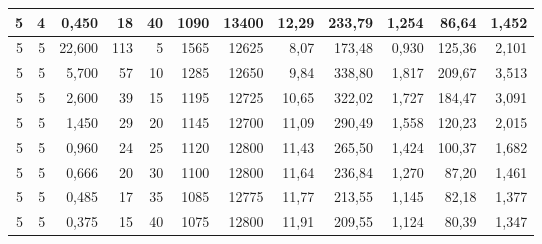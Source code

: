 \begin{tabular}{rrrrrrrrrrrr}
5 & 4 & 0,450 & 18 & 40 & 1090 & 13400 & 12,29 & 233,79 & 1,254 & 86,64 & 1,452 \\ \hline
5 & 5 & 22,600 & 113 & 5 & 1565 & 12625 & 8,07 & 173,48 & 0,930 & 125,36 & 2,101 \\ \hline
5 & 5 & 5,700 & 57 & 10 & 1285 & 12650 & 9,84 & 338,80 & 1,817 & 209,67 & 3,513 \\ \hline
5 & 5 & 2,600 & 39 & 15 & 1195 & 12725 & 10,65 & 322,02 & 1,727 & 184,47 & 3,091 \\ \hline
5 & 5 & 1,450 & 29 & 20 & 1145 & 12700 & 11,09 & 290,49 & 1,558 & 120,23 & 2,015 \\ \hline
5 & 5 & 0,960 & 24 & 25 & 1120 & 12800 & 11,43 & 265,50 & 1,424 & 100,37 & 1,682 \\ \hline
5 & 5 & 0,666 & 20 & 30 & 1100 & 12800 & 11,64 & 236,84 & 1,270 & 87,20 & 1,461 \\ \hline
5 & 5 & 0,485 & 17 & 35 & 1085 & 12775 & 11,77 & 213,55 & 1,145 & 82,18 & 1,377 \\ \hline
5 & 5 & 0,375 & 15 & 40 & 1075 & 12800 & 11,91 & 209,55 & 1,124 & 80,39 & 1,347 \\ \hline
\bottomrule
\end{tabular}
